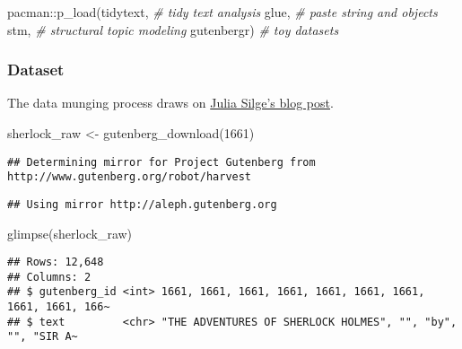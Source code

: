 \documentclass[
]{book}
\newenvironment{Shaded}{\begin{snugshade}}{\end{snugshade}}
\newcommand{\CommentTok}[1]{\textcolor[rgb]{0.56,0.35,0.01}{\textit{#1}}}
\newcommand{\DecValTok}[1]{\textcolor[rgb]{0.00,0.00,0.81}{#1}}
\newcommand{\FunctionTok}[1]{\textcolor[rgb]{0.00,0.00,0.00}{#1}}
\newcommand{\NormalTok}[1]{#1}
\newcommand{\OtherTok}[1]{\textcolor[rgb]{0.56,0.35,0.01}{#1}}
\newcommand{\SpecialCharTok}[1]{\textcolor[rgb]{0.00,0.00,0.00}{#1}}
\begin{document}
\begin{Shaded}
\begin{Highlighting}[]
\NormalTok{pacman}\SpecialCharTok{::}\FunctionTok{p\_load}\NormalTok{(tidytext, }\CommentTok{\# tidy text analysis}
\NormalTok{               glue, }\CommentTok{\# paste string and objects                }
\NormalTok{               stm, }\CommentTok{\# structural topic modeling}
\NormalTok{               gutenbergr) }\CommentTok{\# toy datasets }
\end{Highlighting}
\end{Shaded}

\hypertarget{dataset-1}{%
\subsubsection{Dataset}\label{dataset-1}}

The data munging process draws on \href{https://juliasilge.com/blog/sherlock-holmes-stm/}{Julia Silge's blog post}.

\begin{Shaded}
\begin{Highlighting}[]
\NormalTok{sherlock\_raw }\OtherTok{\textless{}{-}} \FunctionTok{gutenberg\_download}\NormalTok{(}\DecValTok{1661}\NormalTok{)}
\end{Highlighting}
\end{Shaded}

\begin{verbatim}
## Determining mirror for Project Gutenberg from http://www.gutenberg.org/robot/harvest
\end{verbatim}

\begin{verbatim}
## Using mirror http://aleph.gutenberg.org
\end{verbatim}

\begin{Shaded}
\begin{Highlighting}[]
\FunctionTok{glimpse}\NormalTok{(sherlock\_raw)}
\end{Highlighting}
\end{Shaded}

\begin{verbatim}
## Rows: 12,648
## Columns: 2
## $ gutenberg_id <int> 1661, 1661, 1661, 1661, 1661, 1661, 1661, 1661, 1661, 166~
## $ text         <chr> "THE ADVENTURES OF SHERLOCK HOLMES", "", "by", "", "SIR A~
\end{verbatim}
\end{document}
